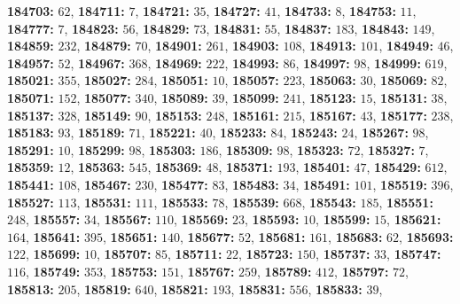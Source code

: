 \textsf{\bfseries 184703:} $62$, \textsf{\bfseries 184711:} $7$, \textsf{\bfseries 184721:} $35$, \textsf{\bfseries 184727:} $41$, \textsf{\bfseries 184733:} $8$, \textsf{\bfseries 184753:} $11$, \textsf{\bfseries 184777:} $7$, \textsf{\bfseries 184823:} $56$, \textsf{\bfseries 184829:} $73$, \textsf{\bfseries 184831:} $55$, \textsf{\bfseries 184837:} $183$, \textsf{\bfseries 184843:} $149$, \textsf{\bfseries 184859:} $232$, \textsf{\bfseries 184879:} $70$, \textsf{\bfseries 184901:} $261$, \textsf{\bfseries 184903:} $108$, \textsf{\bfseries 184913:} $101$, \textsf{\bfseries 184949:} $46$, \textsf{\bfseries 184957:} $52$, \textsf{\bfseries 184967:} $368$, \textsf{\bfseries 184969:} $222$, \textsf{\bfseries 184993:} $86$, \textsf{\bfseries 184997:} $98$, \textsf{\bfseries 184999:} $619$, \textsf{\bfseries 185021:} $355$, \textsf{\bfseries 185027:} $284$, \textsf{\bfseries 185051:} $10$, \textsf{\bfseries 185057:} $223$, \textsf{\bfseries 185063:} $30$, \textsf{\bfseries 185069:} $82$, \textsf{\bfseries 185071:} $152$, \textsf{\bfseries 185077:} $340$, \textsf{\bfseries 185089:} $39$, \textsf{\bfseries 185099:} $241$, \textsf{\bfseries 185123:} $15$, \textsf{\bfseries 185131:} $38$, \textsf{\bfseries 185137:} $328$, \textsf{\bfseries 185149:} $90$, \textsf{\bfseries 185153:} $248$, \textsf{\bfseries 185161:} $215$, \textsf{\bfseries 185167:} $43$, \textsf{\bfseries 185177:} $238$, \textsf{\bfseries 185183:} $93$, \textsf{\bfseries 185189:} $71$, \textsf{\bfseries 185221:} $40$, \textsf{\bfseries 185233:} $84$, \textsf{\bfseries 185243:} $24$, \textsf{\bfseries 185267:} $98$, \textsf{\bfseries 185291:} $10$, \textsf{\bfseries 185299:} $98$, \textsf{\bfseries 185303:} $186$, \textsf{\bfseries 185309:} $98$, \textsf{\bfseries 185323:} $72$, \textsf{\bfseries 185327:} $7$, \textsf{\bfseries 185359:} $12$, \textsf{\bfseries 185363:} $545$, \textsf{\bfseries 185369:} $48$, \textsf{\bfseries 185371:} $193$, \textsf{\bfseries 185401:} $47$, \textsf{\bfseries 185429:} $612$, \textsf{\bfseries 185441:} $108$, \textsf{\bfseries 185467:} $230$, \textsf{\bfseries 185477:} $83$, \textsf{\bfseries 185483:} $34$, \textsf{\bfseries 185491:} $101$, \textsf{\bfseries 185519:} $396$, \textsf{\bfseries 185527:} $113$, \textsf{\bfseries 185531:} $111$, \textsf{\bfseries 185533:} $78$, \textsf{\bfseries 185539:} $668$, \textsf{\bfseries 185543:} $185$, \textsf{\bfseries 185551:} $248$, \textsf{\bfseries 185557:} $34$, \textsf{\bfseries 185567:} $110$, \textsf{\bfseries 185569:} $23$, \textsf{\bfseries 185593:} $10$, \textsf{\bfseries 185599:} $15$, \textsf{\bfseries 185621:} $164$, \textsf{\bfseries 185641:} $395$, \textsf{\bfseries 185651:} $140$, \textsf{\bfseries 185677:} $52$, \textsf{\bfseries 185681:} $161$, \textsf{\bfseries 185683:} $62$, \textsf{\bfseries 185693:} $122$, \textsf{\bfseries 185699:} $10$, \textsf{\bfseries 185707:} $85$, \textsf{\bfseries 185711:} $22$, \textsf{\bfseries 185723:} $150$, \textsf{\bfseries 185737:} $33$, \textsf{\bfseries 185747:} $116$, \textsf{\bfseries 185749:} $353$, \textsf{\bfseries 185753:} $151$, \textsf{\bfseries 185767:} $259$, \textsf{\bfseries 185789:} $412$, \textsf{\bfseries 185797:} $72$, \textsf{\bfseries 185813:} $205$, \textsf{\bfseries 185819:} $640$, \textsf{\bfseries 185821:} $193$, \textsf{\bfseries 185831:} $556$, \textsf{\bfseries 185833:} $39$, 
